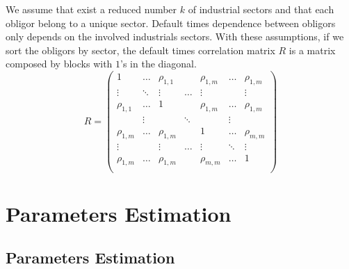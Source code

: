 \documentclass[11pt,fleqn]{book} %
\begin{document}
We assume that exist a reduced number $k$ of industrial sectors and that
each obligor belong to a unique sector. Default times dependence between 
obligors only depends on the involved industrials sectors. With these
assumptions, if we sort the obligors by sector, the default times
correlation matrix $R$ is a matrix composed by blocks with $1$'s in the 
diagonal.
\begin{displaymath}
R =
\left(
\begin{array}{ccccccc}
1           & \dots    & \rho_{1,1}  &                & \rho_{1,m}  & \dots      & \rho_{1,m}  \\
\vdots      & \ddots   & \vdots      &      \dots     & \vdots      &            & \vdots      \\
\rho_{1,1}  & \dots    & 1           &                & \rho_{1,m}  & \dots      & \rho_{1,m}  \\

            &  \vdots  &             &      \ddots    &             & \vdots     &             \\

\rho_{1,m}  & \dots    & \rho_{1,m}  &                & 1           & \dots      & \rho_{m,m}  \\
\vdots      &          & \vdots      &      \dots     & \vdots      & \ddots     & \vdots      \\
\rho_{1,m}  & \dots    & \rho_{1,m}  &                & \rho_{m,m}  & \dots      & 1           \\
\end{array}
\right)
\end{displaymath}



\chapter{Parameters Estimation}
\section{Parameters Estimation}


\end{document}
